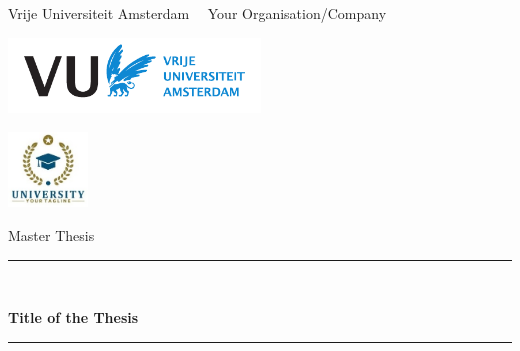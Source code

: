 \documentclass[openany,11pt]{Latex/classes/PhDthesisPSnPDF}
\begin{document}
	
	
	
	\frontmatter %
	
	\thispagestyle{empty} %
	
	
	\begin{center}
		
		Vrije Universiteit Amsterdam \hspace*{2cm} ~~Your Organisation/Company
		
		\vspace{1mm}
		
		\hspace*{-6.5cm}\includegraphics[height=20mm]{frontmatter/figures/vu-griffioen.pdf}
		
		\vspace*{-2cm}\hspace*{7.5cm}\includegraphics[height=20mm]{frontmatter/figures/your_logo.jpg}
		
		\vspace{2cm}
	
		{\Large Master Thesis}
		
		\vspace*{1.5cm}
		
		\rule{.9\linewidth}{.6pt}\\[0.4cm]
		{\huge \bfseries Title of the Thesis\par}\vspace{0.4cm}
		\rule{.9\linewidth}{.6pt}\\[1.5cm]
		
		\vspace*{2mm}
		

\end{center}
\end{document}
